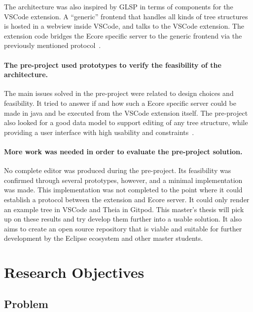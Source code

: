 The architecture was also inspired by \acrshort{GLSP} in terms of components for the \gls{VSCode} extension.
A ``generic'' frontend that handles all kinds of tree structures is hosted in a webview inside \gls{VSCode}, and talks to the \gls{VSCode} extension.
The extension code bridges the \gls{Ecore} specific server to the generic frontend via the previously mentioned protocol~\cite{rekstadModelingEnvironmentCloud2020}.


\paragraph{The pre-project used prototypes to verify the feasibility of the architecture.}
The main issues solved in the pre-project were related to design choices and feasibility.
It tried to answer if and how such a \gls{Ecore} specific server could be made in java and be executed from the \gls{VSCode} extension itself.
The pre-project also looked for a good data model to support editing of any tree structure, while providing a user interface with high usability and constraints~\cite[p.~24,25]{rekstadModelingEnvironmentCloud2020}.

\paragraph{More work was needed in order to evaluate the pre-project solution.}
No complete editor was produced during the pre-project.
Its feasibility was confirmed through several prototypes, however, and a minimal implementation was made.
This implementation was not completed to the point where it could establish a protocol between the extension and \gls{Ecore} server.
It could only render an example tree in \gls{VSCode} and \gls{Theia} in \gls{Gitpod}.
This master's thesis will pick up on these results and try develop them further into a usable solution.
It also aims to create an \gls{open source} repository that is viable and suitable for further development by the Eclipse ecosystem and other master students.

\section{Research Objectives}\label{sec:research-objectives}

\subsection{Problem}

